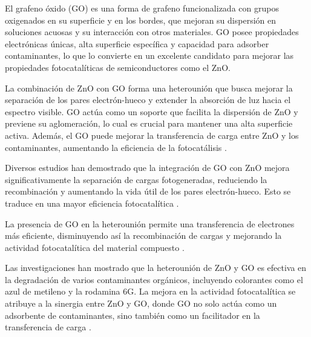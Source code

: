 \documentclass[12pt]{article}
\begin{document}
El grafeno óxido (GO) es una forma de grafeno funcionalizada con grupos oxigenados en su superficie y en los bordes, que mejoran su dispersión en soluciones acuosas y su interacción con otros materiales. GO posee propiedades electrónicas únicas, alta superficie específica y capacidad para adsorber contaminantes, lo que lo convierte en un excelente candidato para mejorar las propiedades fotocatalíticas de semiconductores como el ZnO.
\vspace{1em} %

La combinación de ZnO con GO forma una heterounión que busca mejorar la separación de los pares electrón-hueco y extender la absorción de luz hacia el espectro visible. GO actúa como un soporte que facilita la dispersión de ZnO y previene su aglomeración, lo cual es crucial para mantener una alta superficie activa. Además, el GO puede mejorar la transferencia de carga entre ZnO y los contaminantes, aumentando la eficiencia de la fotocatálisis \cite{IEEEreferencias:ZnO1,IEEEreferencias:ZnO2, IEEEreferencias:ZnO3,IEEEreferencias:ZnO4,IEEEreferencias:ZnO5}.
\vspace{1em} %

Diversos estudios han demostrado que la integración de GO con ZnO mejora significativamente la separación de cargas fotogeneradas, reduciendo la recombinación y aumentando la vida útil de los pares electrón-hueco. Esto se traduce en una mayor eficiencia fotocatalítica \cite{IEEEreferencias:ZnOGO1}. 
\vspace{1em} %

La presencia de GO en la heterounión permite una transferencia de electrones más eficiente, disminuyendo así la recombinación de cargas y mejorando la actividad fotocatalítica del material compuesto \cite{IEEEreferencias:ZnOGO_Fotocatalisis_2}.
\vspace{1em} %

Las investigaciones han mostrado que la heterounión de ZnO y GO es efectiva en la degradación de varios contaminantes orgánicos, incluyendo colorantes como el azul de metileno y la rodamina 6G. La mejora en la actividad fotocatalítica se atribuye a la sinergia entre ZnO y GO, donde GO no solo actúa como un adsorbente de contaminantes, sino también como un facilitador en la transferencia de carga \cite{IEEEreferencias:ZnOGO3}.
\vspace{1em} %
\end{document}
